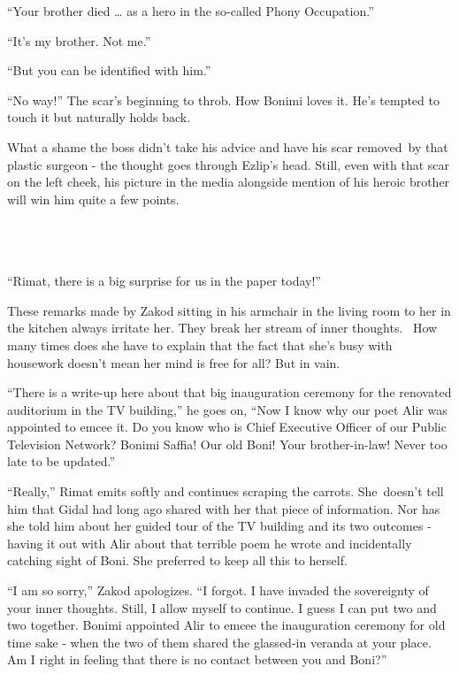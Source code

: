 \documentclass[twoside,11pt]{book}
\begin{document}
``Your brother died {\dots} as a hero in the so-called Phony Occupation.''

``It's my brother. Not me.''

``But you can be identified with him.''

``No way!'' The scar's beginning to throb. How Bonimi loves it. He's tempted to touch it but
naturally holds back.

What a shame the boss didn't take his advice and have his scar removed~by that plastic surgeon - the thought goes
through Ezlip's head. Still, even with that scar on the left cheek, his picture in the media alongside mention of his
heroic brother will win him quite a few points.

~

\chapter{}

``Rimat, there is a big surprise for us in the paper today!''

These remarks made by Zakod sitting in his armchair in the living room to her in the kitchen always irritate her. They
break her stream of inner thoughts. {\ }How many times does she have to
explain{ }that the fact that she's busy with housework doesn't mean her mind is
free for all? But in vain.

``There is a write-up here about that big inauguration ceremony for the renovated auditorium in the TV
building,'' he goes on, ``Now I know why our poet Alir was appointed to emcee it. Do you know who is Chief Executive
Officer of our Public Television Network? Bonimi Saffia! Our old Boni! Your brother-in-law! Never too late to be
updated.''

``Really,'' Rimat emits softly and continues scraping the carrots. She~doesn't tell him that
Gidal had long ago shared with her that piece of information. Nor has she told him about her guided tour of the TV
building and its two outcomes - having it out with Alir about that terrible poem he wrote and incidentally catching
sight of Boni. She preferred to keep all this to herself. ~

``I am so sorry,'' Zakod apologizes. ``I forgot. I have invaded the sovereignty
of your inner thoughts. Still, I allow myself to continue. I guess I can put two and two together. Bonimi appointed
Alir to emcee the inauguration ceremony for old time sake - when the two of them shared the glassed-in veranda at your
place. Am I right in feeling that there is no contact between you and Boni?''
\end{document}
